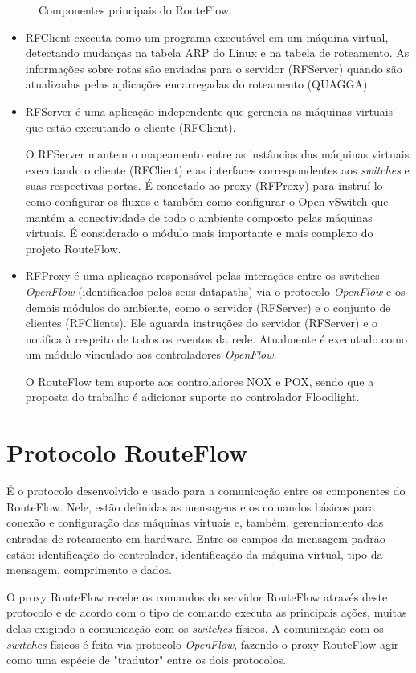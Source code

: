 \begin{figure}[h] 
\centering
\caption{Componentes principais do RouteFlow.}
\label{fig:componentesRouteFlow} 
\end{figure}


\begin{itemize} 
\item RFClient executa como um programa
executável em um máquina virtual, detectando
mudanças na tabela ARP do Linux e na tabela de roteamento.
As informações sobre rotas são enviadas para o
servidor (RFServer) quando são atualizadas pelas aplicações
encarregadas do roteamento (QUAGGA). 

\item RFServer é uma aplicação independente que gerencia as
máquinas virtuais que estão executando o cliente (RFClient). 

O RFServer mantem o mapeamento entre as instâncias das
máquinas virtuais executando o cliente (RFClient) e as interfaces
correspondentes aos \textit{switches} e suas respectivas portas. É
conectado ao proxy (RFProxy) para instruí-lo como configurar os
fluxos e também como configurar o Open vSwitch que mantém a
conectividade de todo o ambiente composto pelas máquinas virtuais.
É considerado o módulo mais importante e mais complexo
do projeto RouteFlow.

\item RFProxy é uma aplicação responsável pelas interações
entre os switches \textit{OpenFlow} (identificados pelos seus
datapaths) via o protocolo \textit{OpenFlow} e os demais
módulos do ambiente, como o servidor (RFServer) e o conjunto
de clientes (RFClients). Ele aguarda instruções
do servidor (RFServer) e o notifica à respeito de todos os eventos da rede.
Atualmente é executado como um módulo vinculado aos
controladores \textit{OpenFlow}. 

O RouteFlow tem suporte aos
controladores NOX e POX, sendo que a proposta do trabalho é
adicionar suporte ao controlador Floodlight. 
\end{itemize}

\section{Protocolo RouteFlow}

É o protocolo desenvolvido e usado para a comunicação entre
os componentes do RouteFlow. Nele, estão definidas as
mensagens e os comandos básicos para conexão e configuração
das máquinas virtuais e, também, gerenciamento das entradas
de roteamento em hardware. Entre os campos da
mensagem-padrão estão: identificação do controlador,
identificação da máquina virtual, tipo da mensagem,
comprimento e dados. 

O proxy RouteFlow recebe os comandos do
servidor RouteFlow através deste protocolo e de acordo com o
tipo de comando executa as principais ações, muitas delas
exigindo a comunicação com os \textit{switches} físicos. A
comunicação com os \textit{switches} físicos é feita via protocolo
\textit{OpenFlow}, fazendo o proxy RouteFlow agir como
uma espécie de "tradutor" entre os dois protocolos.
